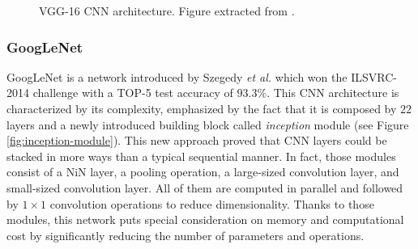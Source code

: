 \begin{figure}[!hbt]
	\centering
  \caption{\acs{VGG}-16 \acs{CNN} architecture. Figure extracted from \cite{Noh2015}.}
	\label{fig:vgg16}
\end{figure}

\subsubsection{GoogLeNet}

GoogLeNet is a network introduced by Szegedy \emph{et al.} \cite{Szegedy2015} which won the \ac{ILSVRC}-2014 challenge with a TOP-5 test accuracy of $93.3\%$. This \acs{CNN} architecture is characterized by its complexity, emphasized by the fact that it is composed by $22$ layers and a newly introduced building block called \emph{inception} module (see Figure \ref{fig:inception-module}). This new approach proved that \acs{CNN} layers could be stacked in more ways than a typical sequential manner. In fact, those modules consist of a \ac{NiN} layer, a pooling operation, a large-sized convolution layer, and small-sized convolution layer. All of them are computed in parallel and followed by $1\times1$ convolution operations to reduce dimensionality. Thanks to those modules, this network puts special consideration on memory and computational cost by significantly reducing the number of parameters and operations.

